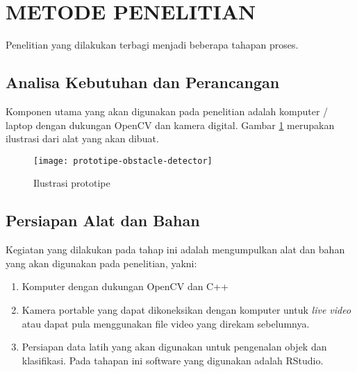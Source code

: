 \section*{METODE PENELITIAN}
Penelitian yang dilakukan terbagi menjadi beberapa tahapan proses. 
\iffalse
Gambar \ref{fig:tahapan} menunjukan tahapan proses tersebut.

\begin{figure}[h!] %
\centering
\texttt{[image: kolokium\_contoh\_gb1.png]}
\caption{Tahapan proses penelitian}
\label{fig:tahapan}
\end{figure}
\fi
\subsection*{Analisa Kebutuhan dan Perancangan}

Komponen utama yang akan digunakan pada penelitian adalah komputer / laptop dengan dukungan OpenCV dan kamera digital. Gambar \ref{fig:alat} merupakan ilustrasi dari alat yang akan dibuat.

\begin{figure}[h!]\centering %
\texttt{[image: prototipe-obstacle-detector]}
\caption{Ilustrasi prototipe}
\label{fig:alat}
\end{figure}

\subsection*{Persiapan Alat dan Bahan}

Kegiatan yang dilakukan pada tahap ini adalah mengumpulkan alat dan bahan yang akan digunakan pada penelitian, yakni:
\begin{enumerate}
	\item Komputer dengan dukungan OpenCV dan C++
	\item Kamera portable yang dapat dikoneksikan dengan komputer untuk \textit{live video} atau dapat pula menggunakan file video yang direkam sebelumnya.
	\item Persiapan data latih yang akan digunakan untuk pengenalan objek dan klasifikasi. Pada tahapan ini software yang digunakan adalah RStudio.
\end{enumerate}

